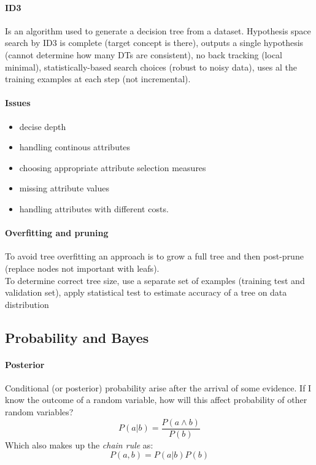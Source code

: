 \paragraph{ID3}

Is an algorithm used to generate a decision tree from a dataset.
Hypothesis space search by ID3 is complete (target concept is there), outputs a single hypothesis (cannot determine how many DTs are consistent), no back tracking (local minimal), statistically-based search choices (robust to noisy data), uses al the training examples at each step (not incremental).

\paragraph{Issues}
\begin{itemize}
\item decise depth
\item handling continous attributes
\item choosing appropriate attribute selection measures
\item missing attribute values
\item handling attributes with different costs.
\end{itemize}

\paragraph{Overfitting and pruning}
To avoid tree overfitting an approach is to grow a full tree and then post-prune (replace nodes not important with leafs).\\
To determine correct tree size, use a separate set of examples (training test and validation set), apply statistical test to estimate accuracy of a tree on data distribution

\subsection{Probability and Bayes}

\paragraph{Posterior}
Conditional (or posterior) probability arise after the arrival of some evidence. If I know the outcome of a random variable, how will this affect probability of other random variables?
\[P(a|b)=\frac{P(a \wedge b)}{P(b)}\]
Which also makes up the \textit{chain rule} as:
$$P(a,b)=P(a|b)P(b)$$




